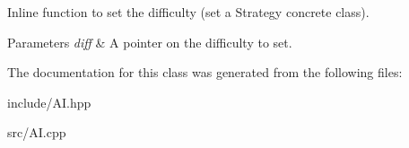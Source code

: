 \-Inline function to set the difficulty (set a \-Strategy concrete class). 


\begin{DoxyParams}{\-Parameters}
{\em diff} & \-A pointer on the difficulty to set. \\
\hline
\end{DoxyParams}


\-The documentation for this class was generated from the following files\-:\begin{DoxyCompactItemize}
\item 
include/\-A\-I.\-hpp\item 
src/\-A\-I.\-cpp\end{DoxyCompactItemize}
